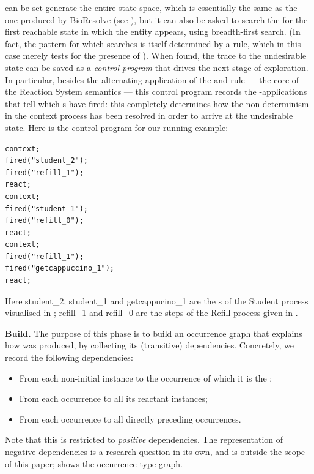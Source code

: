 \GROOVE can be set generate the entire state space, which is essentially the same as the one produced by BioResolve (see ), but it can also be asked to search the for the first reachable state in which the \Forbidden entity appears, using breadth-first search. (In fact, the pattern for which \GROOVE searches is itself determined by a rule, which in this case merely tests for the presence of \Forbidden). When found, the trace to the undesirable state can be saved as a \emph{control program} that drives the next stage of \GROOVE exploration. In particular, besides the alternating application of the \contextR and \reactR rule --- the core of the Reaction System semantics --- this control program records the \firedR-applications that tell which \Step{}s have fired: this completely determines how the non-determinism in the context process has been resolved in order to arrive at the undesirable state. Here is the control program for our running example:

\begin{center}
\begin{lstlisting}[basicstyle=\sffamily\small,columns=fullflexible,xleftmargin=1cm]
context;
fired("student_2");
fired("refill_1");
react;
context;
fired("student_1");
fired("refill_0");
react;
context;
fired("refill_1");
fired("getcappuccino_1");
react;
\end{lstlisting}
\end{center}
%
Here \textsf{student\_2}, \textsf{student\_1} and \textsf{getcappucino\_1} are the \Step{}s of the \textsf{Student} process visualised in ; \textsf{refill\_1} and \textsf{refill\_0} are the steps of the \textsf{Refill} process given in .

\medskip\noindent\textbf{Build.}
%
The purpose of this phase is to build an occurrence graph that explains how \Forbidden was produced, by collecting its (transitive) dependencies. Concretely, we record the following dependencies:
\begin{itemize}
\item From each non-initial \Entity instance to the \Rule occurrence of which it is the \product;
\item From each \Rule occurrence to all its reactant \Entity instances;
\item From each \Step occurrence to all directly preceding \Step occurrences.
\end{itemize}
%
Note that this is restricted to \emph{positive} dependencies. The representation of negative dependencies is a research question in its own, and is outside the scope of this paper;  shows the occurrence type graph. 

